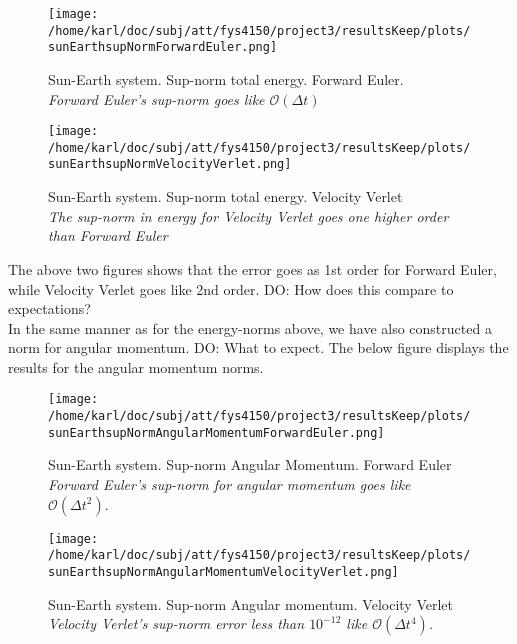 \documentclass{article}
\begin{document}
\begin{minipage}{.49\textwidth} 
	\begin{figure}[H]
		\centering
		\texttt{[image: /home/karl/doc/subj/att/fys4150/project3/resultsKeep/plots/sunEarthsupNormForwardEuler.png]}
		\caption{Sun-Earth system. Sup-norm total energy. Forward Euler. \\ \textit{Forward Euler's sup-norm goes like $\mathcal{O}(\Delta t)$}}
		\label{1}
	\end{figure}
\end{minipage}\hfill
\begin{minipage}{.49\textwidth} 
	\begin{figure}[H]
		\centering
		\texttt{[image: /home/karl/doc/subj/att/fys4150/project3/resultsKeep/plots/sunEarthsupNormVelocityVerlet.png]}
		\caption{Sun-Earth system. Sup-norm total energy. Velocity Verlet \\ \textit{The sup-norm in energy for Velocity Verlet goes one higher order than Forward Euler}}
		\label{1}
	\end{figure}
\end{minipage}\hfill
\vspace{2ex}

The above two figures shows that the error goes as 1st order for Forward Euler, while Velocity Verlet goes like 2nd order. DO: How does this compare to expectations?\\

In the same manner as for the energy-norms above, we have also constructed a norm for angular momentum. DO: What to expect. The below figure displays the results for the angular momentum norms.

\begin{minipage}{.49\textwidth} 
	\begin{figure}[H]
		\centering
		\texttt{[image: /home/karl/doc/subj/att/fys4150/project3/resultsKeep/plots/sunEarthsupNormAngularMomentumForwardEuler.png]}
		\caption{Sun-Earth system. Sup-norm Angular Momentum. Forward Euler \\ \textit{Forward Euler's sup-norm for angular momentum goes like $\mathcal{O}(\Delta t^2)$}.}
		\label{1}
	\end{figure}
\end{minipage}\hfill
\begin{minipage}{.49\textwidth} 
	\begin{figure}[H]
		\centering
		\texttt{[image: /home/karl/doc/subj/att/fys4150/project3/resultsKeep/plots/sunEarthsupNormAngularMomentumVelocityVerlet.png]}
		\caption{Sun-Earth system. Sup-norm Angular momentum. Velocity Verlet \\ \textit{Velocity Verlet's sup-norm error less than $10^{-12}$ like $\mathcal{O}(\Delta t^4)$.}}
		\label{1}
	\end{figure}
\end{minipage}\hfill
\vspace{2ex}
\end{document}
